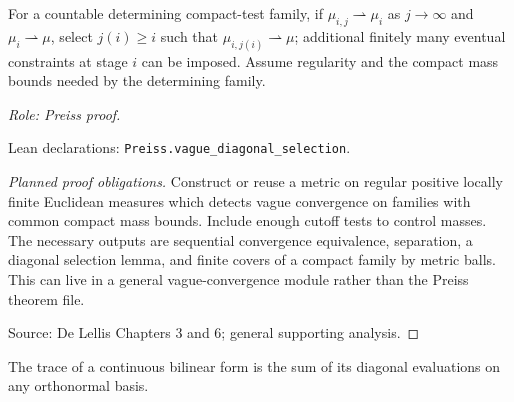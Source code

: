 \begin{lemma}
\label{lem:vague-diagonal}






For a countable determining compact-test family, if $\mu_{i,j}\rightharpoonup\mu_i$ as $j\to\infty$ and $\mu_i\rightharpoonup\mu$, select $j(i)\geq i$ such that $\mu_{i,j(i)}\rightharpoonup\mu$; additional finitely many eventual constraints at stage $i$ can be imposed. Assume regularity and the compact mass bounds needed by the determining family.
\par\emph{Role: Preiss proof.}
\par Lean declarations: \texttt{Preiss.vague\_diagonal\_selection}.
\end{lemma}
\begin{proof}[Planned proof obligations]

Construct or reuse a metric on regular positive locally finite Euclidean
measures which detects vague convergence on families with common compact mass
bounds. Include enough cutoff tests to control masses. The necessary outputs are
sequential convergence equivalence, separation, a diagonal selection lemma,
and finite covers of a compact family by metric balls. This can live in a
general vague-convergence module rather than the Preiss theorem file.
\par Source: De Lellis Chapters 3 and 6; general supporting analysis.
\end{proof}

\begin{lemma}
\label{lem:bilinear-trace-basis}


The trace of a continuous bilinear form is the sum of its diagonal evaluations on any orthonormal basis.
\end{lemma}


